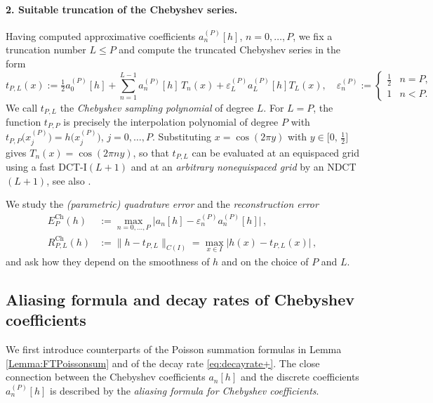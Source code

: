 \documentclass[11pt,a4paper]{scrartcl}
\numberwithin{equation}{section}
\numberwithin{table}{section}
\numberwithin{figure}{section}
\newcommand{\Ech}{E^{\mathrm{Ch}}}
\newcommand{\Rch}{R^{\mathrm{Ch}}}
\begin{document}
\paragraph{2. Suitable truncation of the Chebyshev series.}
Having computed approximative coefficients $a_n^{(P)}[h]$, $n=0, \ldots, P$, we  fix a truncation
number $L \le P$ and compute the truncated Chebyshev series in the form
\begin{equation}
	\label{eq:samplingpoly}
	 \textstyle t_{P,L}(x) \!:= \tfrac12 a_0^{(P)}[h]
	+\! \sum\limits_{n=1}^{L-1} a_n^{(P)}[h]\,T_n(x)
	+\varepsilon_L^{(P)} a_L^{(P)}[h] T_L(x), \quad
	\varepsilon_n^{(P)} := \left\{\begin{array}{ll} \tfrac12 & n = P,\\ 1 & n<P.\end{array}\right.
\end{equation}
We call  $t_{P,L}$  the \emph{Chebyshev sampling polynomial} of degree $L$.
For $L=P$, the function $t_{P,P}$ is
precisely the interpolation polynomial of degree $P$ with
$t_{P,P}\big(x_j^{(P)}\big) = h\big(x_j^{(P)}\big)$, $j=0,\ldots,P$.
Substituting $x = \cos (2\pi y)$ with $y \in
\big[0,\,\tfrac12\big]$ gives $T_n(x) = \cos(2\pi n y)$, so that $t_{P,L}$
can be evaluated at an equispaced grid using a fast DCT-I$(L+1)$ and at an \emph{arbitrary nonequispaced grid} by an
NDCT$(L+1)$,
see also \cite[Algorithm~2.3]{PoStTa98}.
\medskip

We study the \emph{(parametric) quadrature error} and the \emph{reconstruction error}
\begin{align}
	\label{eq:Ech}
	\Ech_{P}(h) &:= \max_{n=0, \ldots ,P} \big|a_n[h] - \varepsilon_n^{(P)} a_n^{(P)}[h]\big|\,,\\
	\label{eq:EN}
	\Rch_{P,L}(h) &:= \|h - t_{P,L}\|_{C(I)} = \max_{x\in I} \bigl|h(x) - t_{P,L}(x)\bigr|\,,
\end{align}
and ask how they depend on the smoothness of $h$ and on the choice of $P$ and $L$.

\subsection{Aliasing formula and decay rates of Chebyshev coefficients}
\label{sec:aliasingcheb}

We first introduce counterparts of the Poisson summation formulas in Lemma
\ref{Lemma:FTPoissonsum} and of the decay rate \eqref{eq:decayrate+}. The  close connection between the
Chebyshev coefficients $a_n[h]$ and the discrete coefficients $a_n^{(P)}[h]$ is described by the
\emph{aliasing formula for Chebyshev coefficients}.
\end{document}
